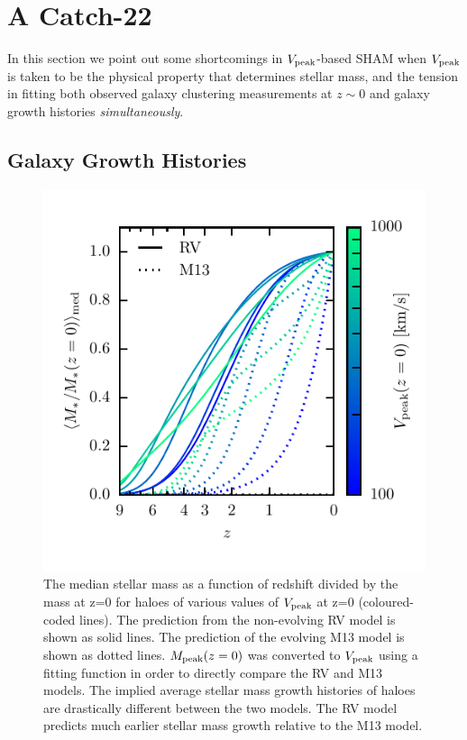\documentclass[useAMS,fleqn,usenatbib]{mnras}
\begin{document}
\section{A Catch-22}
\label{sec:not_such_a_miracle}

In this section we point out some shortcomings in $V_{\rm peak}$-based SHAM when $V_{\rm peak}$ is taken to be the physical property that determines stellar mass, and the tension in fitting both observed galaxy clustering measurements at $z\sim 0$ and galaxy growth histories {\em simultaneously}.

\subsection{Galaxy Growth Histories}

\begin{figure}
    \includegraphics[width=\columnwidth]{figures/mstar_of_z_rm.pdf}
    \caption{The median stellar mass as a function of redshift divided by the mass at z=0 for haloes of various values of $V_{\rm peak}$ at z=0 (coloured-coded lines).  The prediction from the non-evolving RV model is shown as solid lines.  The prediction of the evolving M13 model is shown as dotted lines.  $M_{\rm peak}(z=0)$ was converted to $V_{\rm peak}$ using a fitting function in order to directly compare the RV and M13 models.  The implied average stellar mass growth histories of haloes are drastically different between the two models.  The RV model predicts {\rm much} earlier stellar mass growth relative to the M13 model.}
    \label{fig:mstar_of_z_rm}
\end{figure}
\end{document}
